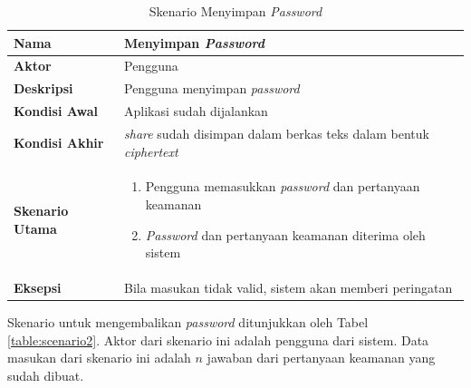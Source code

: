 \begin{table}[H]
	\centering
	\caption{Skenario Menyimpan \textit{Password}} \label{table:scenario1}
	\begin{tabular}{|l|p{12cm}|}
		\hline
		\textbf{Nama} 					& Menyimpan \textit{Password} 																											\\ \hline
		\textbf{Aktor}					& Pengguna																																					\\ \hline
		\textbf{Deskripsi} 			& Pengguna menyimpan \textit{password} 																							\\ \hline
		\textbf{Kondisi Awal} 	& Aplikasi sudah dijalankan																													\\ \hline
		\textbf{Kondisi Akhir}	& \textit{share} sudah disimpan dalam berkas teks dalam bentuk \textit{ciphertext}	\\ \hline
		\textbf{Skenario Utama} & \begin{enumerate}[itemsep=0mm]\item Pengguna memasukkan \textit{password} dan pertanyaan keamanan \item \textit{Password} dan pertanyaan keamanan diterima oleh sistem\end{enumerate} \\ \hline
		\textbf{Eksepsi}				& Bila masukan tidak valid, sistem akan memberi peringatan \\ \hline
	\end{tabular}
\end{table}

Skenario untuk mengembalikan \textit{password} ditunjukkan oleh Tabel \ref{table:scenario2}. Aktor dari skenario ini adalah pengguna dari sistem. Data masukan dari skenario ini adalah $n$ jawaban dari pertanyaan keamanan yang sudah dibuat.

